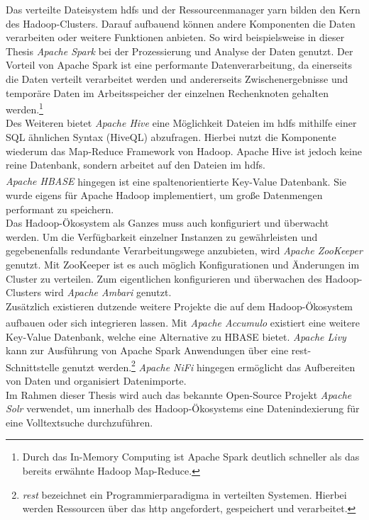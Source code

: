 \noindent
Das verteilte Dateisystem \gls{hdfs} und der Ressourcenmanager \acrshort{yarn} bilden den Kern des Hadoop-Clusters. Darauf aufbauend können andere Komponenten die Daten verarbeiten oder weitere Funktionen anbieten.
So wird beispielsweise in dieser Thesis \textit{Apache Spark\texttrademark\thinspace} bei der Prozessierung und Analyse der Daten genutzt. Der Vorteil von Apache Spark ist eine performante Datenverarbeitung, da einerseits die Daten verteilt verarbeitet werden und andererseits Zwischenergebnisse und temporäre Daten im Arbeitsspeicher der einzelnen Rechenknoten gehalten werden.\footnote{Durch das In-Memory Computing ist Apache Spark deutlich schneller als das bereits erwähnte Hadoop Map-Reduce.}\\
Des Weiteren bietet \textit{Apache Hive\texttrademark\thinspace} eine Möglichkeit Dateien im \gls{hdfs} mithilfe einer SQL ähnlichen Syntax (HiveQL) abzufragen. Hierbei nutzt die Komponente wiederum das Map-Reduce Framework von Hadoop. Apache Hive ist jedoch keine reine Datenbank, sondern arbeitet auf den Dateien im \gls{hdfs}.\\
\textit{Apache HBASE\textsuperscript{\textregistered}} hingegen ist eine spaltenorientierte Key-Value Datenbank. Sie wurde eigens für Apache Hadoop implementiert, 
um große Datenmengen performant zu speichern.\\

\noindent
Das Hadoop-Ökosystem als Ganzes muss auch konfiguriert und überwacht werden. Um die Verfügbarkeit einzelner Instanzen zu gewährleisten und gegebenenfalls redundante Verarbeitungswege anzubieten, wird \textit{Apache ZooKeeper\texttrademark\thinspace} genutzt. Mit ZooKeeper ist es auch möglich Konfigurationen und Änderungen im Cluster zu verteilen. Zum eigentlichen konfigurieren und überwachen des Hadoop-Clusters wird \textit{Apache Ambari\texttrademark\thinspace} genutzt.\\

\noindent
Zusätzlich existieren dutzende weitere Projekte die auf dem Hadoop-Ökosystem aufbauen oder sich integrieren lassen. Mit \textit{Apache Accumulo\textsuperscript{\textregistered}} existiert eine weitere Key-Value Datenbank, welche eine Alternative zu HBASE bietet. \textit{Apache Livy} kann zur Ausführung von Apache Spark Anwendungen über eine \acrshort{rest}-Schnittstelle genutzt werden.\footnote{\textit{\gls{rest}} bezeichnet ein Programmierparadigma in verteilten Systemen. Hierbei werden Ressourcen über das \gls{http} angefordert, gespeichert und verarbeitet.} \textit{Apache NiFi} hingegen ermöglicht das Aufbereiten von Daten und organisiert Datenimporte.\\
Im Rahmen dieser Thesis wird auch das bekannte Open-Source Projekt \textit{Apache Solr\texttrademark\thinspace} verwendet, um innerhalb des Hadoop-Ökosystems eine Datenindexierung für eine Volltextsuche durchzuführen.\\


